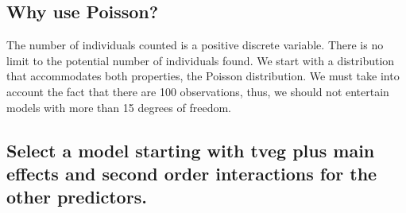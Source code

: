 \documentclass{article}
\begin{document}
\subsection{Why use Poisson?}
The number of individuals counted is a positive discrete variable. There is no limit to the potential number of individuals found. We start with a distribution that accommodates both properties, the Poisson distribution. We must take into account the fact that there are 100 observations, thus, we should not entertain models with more than 15 degrees of freedom.

\subsection{Select a model starting with tveg plus main effects and second order interactions for the other predictors.}
\end{document}
